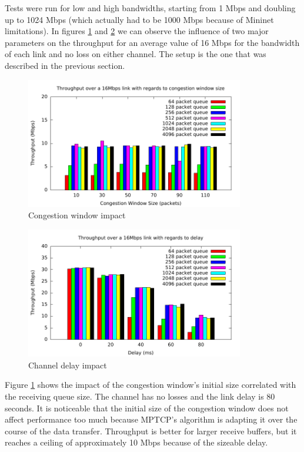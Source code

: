 
Tests were run for low and high bandwidths, starting from 1 Mbps and doubling
up to 1024 Mbps (which actually had to be 1000 Mbps because of Mininet
limitations). In figures \ref{fig:16mbps-cw} and \ref{fig:16mbps-d}  we can
observe the influence of two major parameters on the throughput for an average
value of 16 Mbps for the bandwidth of each link and no loss on either channel.
The setup is the one that was described in the previous section.

\begin{figure}
  \centering
  \includegraphics[width=0.85\textwidth]{img/throughput-cwnd-16Mbps}
  \caption{Congestion window impact}
  \label{fig:16mbps-cw}
\end{figure}

\begin{figure}
  \centering
  \includegraphics[width=0.85\textwidth]{img/throughput-delay-16Mbps}
  \caption{Channel delay impact}
  \label{fig:16mbps-d}
\end{figure}

Figure \ref{fig:16mbps-cw} shows the impact of the congestion window's initial size correlated with the receiving queue size. The channel has no losses and the link delay is 80 seconds. It is noticeable that the initial size of the congestion window does not affect performance too much because MPTCP's algorithm is adapting it over the course of the data transfer. Throughput is better for larger receive buffers, but it reaches a ceiling of approximately 10 Mbps because of the sizeable delay.

